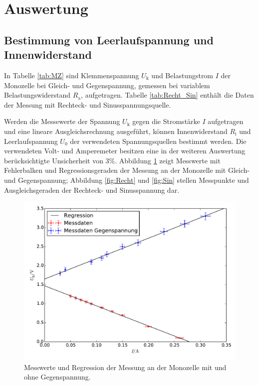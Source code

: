 \newpage
\section{Auswertung}
\label{sec:Auswertung}
\subsection{Bestimmung von Leerlaufspannung und Innenwiderstand}
In Tabelle \ref{tab:MZ} sind Klemmenspannung $U_\mathup{k}$ und Belastungstrom $I$ der Monozelle bei Gleich- und Gegenspannung, gemessen bei variablem Belastungswiderstand $R_\mathup{a}$, aufgetragen. Tabelle \ref{tab:Recht_Sin} enthält die Daten der Messung mit Rechteck- und Sinusspannungsquelle.



Werden die Messewerte der Spannung $U_\mathup{k}$ gegen die Stromstärke $I$ aufgetragen und eine lineare Ausgleichsrechnung ausgeführt,  können Innenwiderstand $R_\mathup{i}$ und Leerlaufspannung $U_0$ der verwendeten Spannungsquellen bestimmt werden.
Die verwendeten Volt- und Amperemeter besitzen eine in der weiteren Auswertung berücksichtigte  Unsicherheit von 3\%. Abbildung \ref{fig:MZ} zeigt Messwerte mit Fehlerbalken und Regressionsgeraden der Messung an der Monozelle mit Gleich- und Gegenspannung; Abbildung \ref{fig:Recht} und \ref{fig:Sin} stellen Messpunkte und Ausgleichsgeraden der Rechteck- und Sinusspannung dar.
\begin{figure}[h]
	\centering
	\includegraphics[width=\textwidth]{content/plot_MZ.pdf}
	\caption{Messwerte und Regression der Messung an der Monozelle mit und ohne Gegenspannung.}
\label{fig:MZ}
\end{figure}
